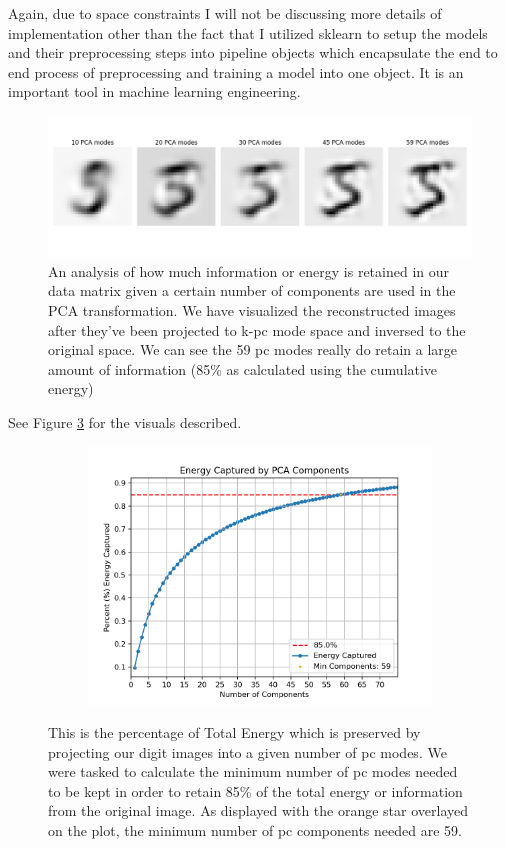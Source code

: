 \documentclass[11pt]{amsart}
\begin{document}
Again, due to space constraints I will not be discussing more details of implementation other than the fact that I utilized sklearn to setup the models and their preprocessing steps into pipeline objects which encapsulate the end to end process of preprocessing and training a model into one object.
It is an important tool in machine learning engineering.

\begin{figure}[h]
	\centering
	\includegraphics[width=.5\textwidth]{../visualizations/digit_reconstruction.png}
 	\caption{ An analysis of how much information or energy is retained in our data matrix given a certain number of components are used in the PCA transformation.
	We have visualized the reconstructed images after they've been projected to k-pc mode space and inversed to the original space.
	We can see the 59 pc modes really do retain a large amount of information (85\% as calculated using the cumulative energy)}\label{fig:f0}
\end{figure}

See Figure \ref{fig:f1} for the visuals described.

\begin{figure}[h]
    \centering
    \begin{subfigure}{0.4\textwidth}
        \centering
        \includegraphics[width=\textwidth]{../visualizations/energy_by_components.png}
        \label{fig:image1}
    \end{subfigure}
    \caption{ This is the percentage of Total Energy which is preserved by projecting our digit images into a given number of pc modes. 
    We were tasked to calculate the minimum number of pc modes needed to be kept in order to retain 85\% of the total energy or information from the original image.
    As displayed with the orange star overlayed on the plot, the minimum number of pc components needed are 59.}
    \label{fig:f1}
\end{figure}
\end{document}
